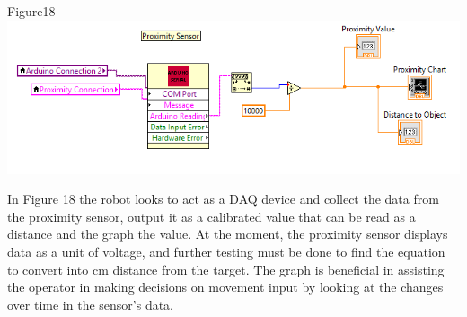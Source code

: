 \documentclass{article}
\begin{document}
\begin{center}{Figure18 \includegraphics[width=\textwidth]{ProximitySensor.png}}\end{center}
In Figure 18 the robot looks to act as a DAQ device and collect the data from the proximity sensor, output it as a calibrated value that can be read as a distance and the graph the value. At the moment, the proximity sensor displays data as a unit of voltage, and further testing must be done to find the equation to convert into cm distance from the target. The graph is beneficial in assisting the operator in making decisions on movement input by looking at the changes over time in the sensor's data.
\end{document}
